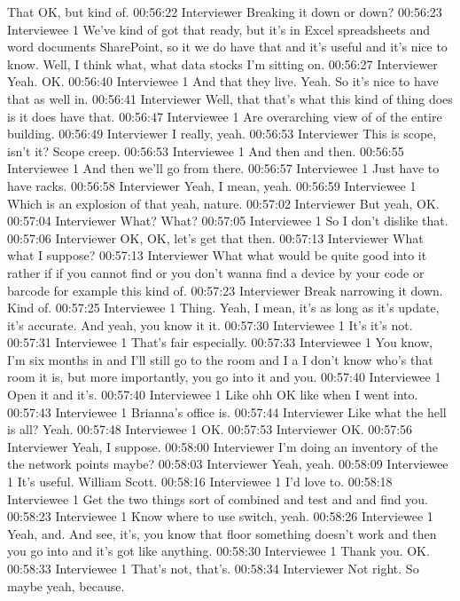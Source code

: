 That OK, but kind of.
00:56:22 Interviewer
Breaking it down or down?
00:56:23 Interviewee 1
We've kind of got that ready, but it's in Excel spreadsheets and word documents SharePoint, so it we do have that and it's useful and it's nice to know. Well, I think what, what data stocks I'm sitting on.
00:56:27 Interviewer
Yeah. OK.
00:56:40 Interviewee 1
And that they live. Yeah. So it's nice to have that as well in.
00:56:41 Interviewer
Well, that that's what this kind of thing does is it does have that.
00:56:47 Interviewee 1
Are overarching view of of the entire building.
00:56:49 Interviewer
I really, yeah.
00:56:53 Interviewer
This is scope, isn't it? Scope creep.
00:56:53 Interviewee 1
And then and then.
00:56:55 Interviewee 1
And then we'll go from there.
00:56:57 Interviewee 1
Just have to have racks.
00:56:58 Interviewer
Yeah, I mean, yeah.
00:56:59 Interviewee 1
Which is an explosion of that yeah, nature.
00:57:02 Interviewer
But yeah, OK.
00:57:04 Interviewer
What? What?
00:57:05 Interviewee 1
So I don't dislike that.
00:57:06 Interviewer
OK, OK, let's get that then.
00:57:13 Interviewer
What what I suppose?
00:57:13 Interviewer
What what would be quite good into it rather if if you cannot find or you don't wanna find a device by your code or barcode for example this kind of.
00:57:23 Interviewer
Break narrowing it down. Kind of.
00:57:25 Interviewee 1
Thing. Yeah, I mean, it's as long as it's update, it's accurate. And yeah, you know it it.
00:57:30 Interviewee 1
It's it's not.
00:57:31 Interviewee 1
That's fair especially.
00:57:33 Interviewee 1
You know, I'm six months in and I'll still go to the room and I a I don't know who's that room it is, but more importantly, you go into it and you.
00:57:40 Interviewee 1
Open it and it's.
00:57:40 Interviewee 1
Like ohh OK like when I went into.
00:57:43 Interviewee 1
Brianna's office is.
00:57:44 Interviewer
Like what the hell is all? Yeah.
00:57:48 Interviewee 1
OK.
00:57:53 Interviewer
OK.
00:57:56 Interviewer
Yeah, I suppose.
00:58:00 Interviewer
I'm doing an inventory of the the network points maybe?
00:58:03 Interviewer
Yeah, yeah.
00:58:09 Interviewee 1
It's useful. William Scott.
00:58:16 Interviewee 1
I'd love to.
00:58:18 Interviewee 1
Get the two things sort of combined and test and and find you.
00:58:23 Interviewee 1
Know where to use switch, yeah.
00:58:26 Interviewee 1
Yeah, and. And see, it's, you know that floor something doesn't work and then you go into and it's got like anything.
00:58:30 Interviewee 1
Thank you. OK.
00:58:33 Interviewee 1
That's not, that's.
00:58:34 Interviewer
Not right. So maybe yeah, because.
